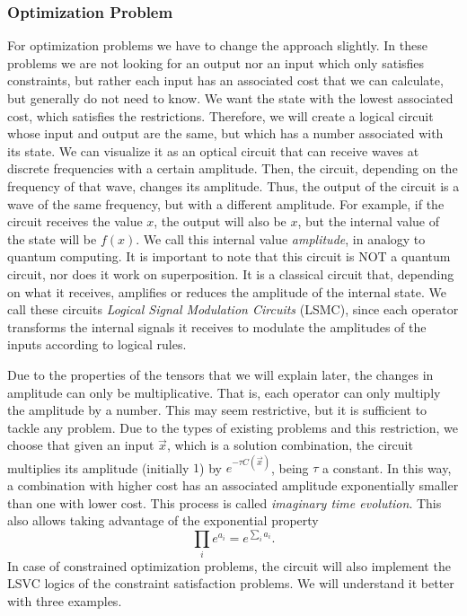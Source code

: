 \subsubsection{Optimization Problem}
For optimization problems we have to change the approach slightly. In these problems we are not looking for an output nor an input which only satisfies constraints, but rather each input has an associated cost that we can calculate, but generally do not need to know. We want the state with the lowest associated cost, which satisfies the restrictions. Therefore, we will create a logical circuit whose input and output are the same, but which has a number associated with its state. We can visualize it as an optical circuit that can receive waves at discrete frequencies with a certain amplitude. Then, the circuit, depending on the frequency of that wave, changes its amplitude. Thus, the output of the circuit is a wave of the same frequency, but with a different amplitude. For example, if the circuit receives the value $x$, the output will also be $x$, but the internal value of the state will be $f(x)$. We call this internal value \textit{amplitude}, in analogy to quantum computing. It is important to note that this circuit is NOT a quantum circuit, nor does it work on superposition. It is a classical circuit that, depending on what it receives, amplifies or reduces the amplitude of the internal state. We call these circuits \textit{Logical Signal Modulation Circuits} (LSMC), since each operator transforms the internal signals it receives to modulate the amplitudes of the inputs according to logical rules. 

Due to the properties of the tensors that we will explain later, the changes in amplitude can only be multiplicative. That is, each operator can only multiply the amplitude by a number. This may seem restrictive, but it is sufficient to tackle any problem. Due to the types of existing problems and this restriction, we choose that given an input $\vec{x}$, which is a solution combination, the circuit multiplies its amplitude (initially $1$) by $e^{-\tau C(\vec{x})}$, being $\tau$ a constant. In this way, a combination with higher cost has an associated amplitude exponentially smaller than one with lower cost. This process is called \textit{imaginary time evolution}. This also allows taking advantage of the exponential property
\begin{equation}
    \prod_{i} e^{a_i}= e^{\sum_i a_i}.
\end{equation}
In case of constrained optimization problems, the circuit will also implement the LSVC logics of the constraint satisfaction problems. We will understand it better with three examples.



